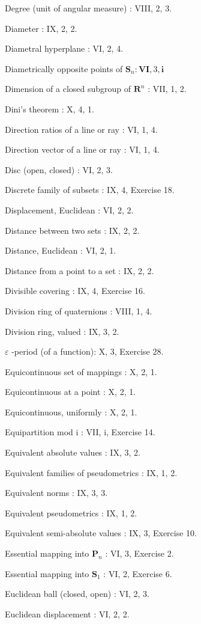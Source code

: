 Degree (unit of angular measure) : VIII, 2, 3.

Diameter : IX, 2, 2.

Diametral hyperplane : VI, 2, 4.

Diametrically opposite points of \(\mathbf{S}_n:\mathbf{VI},3,\mathbf{i}\)

Dimension of a closed subgroup of \(\mathbf{R}^n\) : VII, 1, 2.

Dini's theorem : X, 4, 1.

Direction ratios of a line or ray : VI, 1, 4.

Direction vector of a line or ray : VI, 1, 4.

Disc (open, closed) : VI, 2, 3.

Discrete family of subsets : IX, 4, Exercise 18.

Displacement, Euclidean : VI, 2, 2.

Distance between two sets : IX, 2, 2.

Distance, Euclidean : VI, 2, 1.

Distance from a point to a set : IX, 2, 2.

Divisible covering : IX, 4, Exercise 16.

Division ring of quaternions : VIII, 1, 4.

Division ring, valued : IX, 3, 2.

\(\varepsilon\) -period (of a function): X, 3, Exercise 28.

Equicontinuous set of mappings : X, 2, 1.

Equicontinuous at a point : X, 2, 1.

Equicontinuous, uniformly : X, 2, 1.

Equipartition mod i : VII, i, Exercise 14.

Equivalent absolute values : IX, 3, 2.

Equivalent families of pseudometrics : IX, 1, 2.

Equivalent norms : IX, 3, 3.

Equivalent pseudometrics : IX, 1, 2.

Equivalent semi-absolute values : IX, 3, Exercise 10.

Essential mapping into \(\mathbf{P}_n\) : VI, 3, Exercise 2.

Essential mapping into \(\mathbf{S}_1\) : VI, 2, Exercise 6.

Euclidean ball (closed, open) : VI, 2, 3.

Euclidean displacement : VI, 2, 2.

